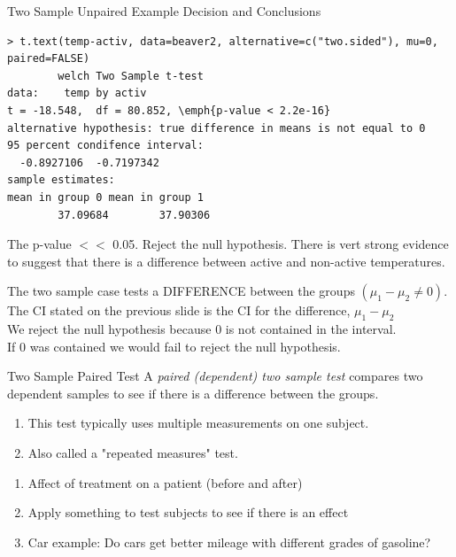 \documentclass[xcolor=svgnames, 10pt, handout]{beamer}
\begin{document}
\begin{frame}[fragile]{Two Sample Unpaired Example Decision and Conclusions}
\begin{Verbatim}[xleftmargin=2em, xrightmargin=1.5em, frame=single, label=Using CI-value, framesep=0.5em, commandchars=\\\{\}, fontsize=\footnotesize]
> t.text(temp-activ, data=beaver2, alternative=c("two.sided"), mu=0,
paired=FALSE)
        welch Two Sample t-test
data:    temp by activ
t = -18.548,  df = 80.852, \emph{p-value < 2.2e-16}
alternative hypothesis: true difference in means is not equal to 0
95 percent condifence interval:
  -0.8927106  -0.7197342
sample estimates:
mean in group 0 mean in group 1
        37.09684        37.90306
\end{Verbatim}
The p-value $<<$ 0.05.
\vfill
Reject the null hypothesis. There is vert strong evidence to suggest that there is a difference between active and non-active temperatures. 
\end{frame}

\begin{frame}
The two sample case tests a DIFFERENCE between the groups $(\mu_1 - \mu_2 \neq 0)$. \\[0.2in]
The CI stated on the previous slide is the CI for the difference, $\mu_1 - \mu_2$\\[0.2in]
We reject the null hypothesis because 0 is not contained in the interval. \\[0.2in]
If 0 was contained we would fail to reject the null hypothesis.
%
\end{frame}

\begin{frame}[fragile]{Two Sample Paired Test}
A \emph{paired (dependent) two sample test} compares two dependent samples to see if there is a difference between the groups.
\begin{enumerate}
\item This test typically uses multiple measurements on one subject.
\item Also called a "repeated measures" test.
\end{enumerate}
\vfill
\begin{examples}
\begin{enumerate}
\item Affect of treatment on a patient (before and after)
\item Apply something to test subjects to see if there is an effect
\item Car example: Do cars get better mileage with different grades of gasoline?
\end{enumerate}
\end{examples}

\end{frame}
\end{document}
